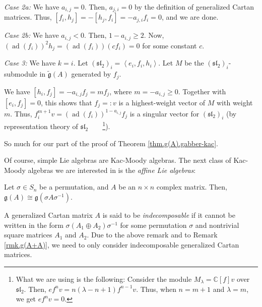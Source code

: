 \documentclass[etingof-lie.tex]{subfiles}
\begin{document}
\textit{Case 2a:} We have $a_{i,j}=0$. Then, $a_{j,i}=0$ by the definition of
generalized Cartan matrices. Thus, $\left[  f_{i},h_{j}\right]  =-\left[
h_{j},f_{i}\right]  =-a_{j,i}f_{i}=0$, and we are done.

\textit{Case 2b:} We have $a_{i,j}<0$. Then, $1-a_{i,j}\geq2$. Now, $\left(
\operatorname*{ad}\left(  f_{i}\right)  \right)  ^{2}h_{j}=\left(
\operatorname*{ad}\left(  f_{i}\right)  \right)  \left(  cf_{i}\right)  =0$
for some constant $c$.

\textit{Case 3:} We have $k=i$. Let $\left(  \mathfrak{sl}_{2}\right)
_{i}=\left\langle e_{i},f_{i},h_{i}\right\rangle $. Let $M$ be the $\left(
\mathfrak{sl}_{2}\right)  _{i}$-submodule in $\widetilde{\mathfrak{g}}\left(
A\right)  $ generated by $f_{j}$.

We have $\left[  h_{i},f_{j}\right]  =-a_{i,j}f_{j}=mf_{j}$, where
$m=-a_{i,j}\geq0$. Together with $\left[  e_{i},f_{j}\right]  =0$, this shows
that $f_{j}=:v$ is a highest-weight vector of $M$ with weight $m$. Thus,
$f_{i}^{m+1}v=\left(  \operatorname*{ad}\left(  f_{i}\right)  \right)
^{1-a_{i,j}}f_{j}$ is a singular vector for $\left(  \mathfrak{sl}_{2}\right)
_{i}$ (by representation theory of $\mathfrak{sl}_{2}$\ \ \ \ \footnote{What
we are using is the following: Consider the module $M_{\lambda}=\mathbb{C}%
\left[  f\right]  v$ over $\mathfrak{sl}_{2}$. Then, $ef^{n}v=n\left(
\lambda-n+1\right)  f^{n-1}v$. Thus, when $n=m+1$ and $\lambda=m$, we get
$ef^{n}v=0$.}).

So much for our part of the proof of Theorem \ref{thm.g(A).gabber-kac}.

Of course, simple Lie algebras are Kac-Moody algebras. The next class of
Kac-Moody algebras we are interested in is the \textit{affine Lie algebras}:

\begin{remark}
Let $\sigma\in S_{n}$ be a permutation, and $A$ be an $n\times n$ complex
matrix. Then, $\mathfrak{g}\left(  A\right)  \cong\mathfrak{g}\left(  \sigma
A\sigma^{-1}\right)  $.
\end{remark}

\begin{definition}
A generalized Cartan matrix $A$ is said to be \textit{indecomposable} if it
cannot be written in the form $\sigma\left(  A_{1}\oplus A_{2}\right)
\sigma^{-1}$ for some permutation $\sigma$ and nontrivial square matrices
$A_{1}$ and $A_{2}$. Due to the above remark and to Remark \ref{rmk.g(A+A)},
we need to only consider indecomposable generalized Cartan matrices.
\end{definition}
\end{document}
